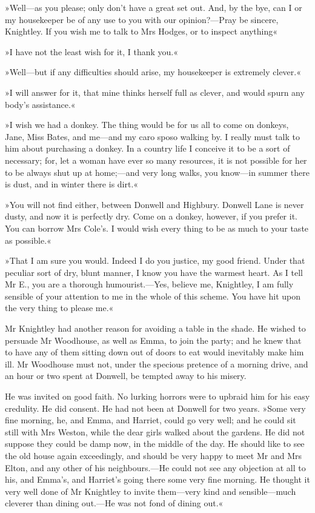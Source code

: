 »Well—as you please; only don't have a great set out. And, by the bye, can I or my housekeeper be of any use to you with our opinion?—Pray be sincere, Knightley. If you wish me to talk to Mrs Hodges, or to inspect anything\longdash«

»I have not the least wish for it, I thank you.«

»Well—but if any difficulties should arise, my housekeeper is extremely clever.«

»I will answer for it, that mine thinks herself full as clever, and would spurn any body's assistance.«

»I wish we had a donkey. The thing would be for us all to come on donkeys, Jane, Miss Bates, and me—and my caro sposo walking by. I really must talk to him about purchasing a donkey. In a country life I conceive it to be a sort of necessary; for, let a woman have ever so many resources, it is not possible for her to be always shut up at home;—and very long walks, you know—in summer there is dust, and in winter there is dirt.«

»You will not find either, between Donwell and Highbury. Donwell Lane is never dusty, and now it is perfectly dry. Come on a donkey, however, if you prefer it. You can borrow Mrs Cole's. I would wish every thing to be as much to your taste as possible.«

»That I am sure you would. Indeed I do you justice, my good friend. Under that peculiar sort of dry, blunt manner, I know you have the warmest heart. As I tell Mr E., you are a thorough humourist.—Yes, believe me, Knightley, I am fully sensible of your attention to me in the whole of this scheme. You have hit upon the very thing to please me.«

Mr Knightley had another reason for avoiding a table in the shade. He wished to persuade Mr Woodhouse, as well as Emma, to join the party; and he knew that to have any of them sitting down out of doors to eat would inevitably make him ill. Mr Woodhouse must not, under the specious pretence of a morning drive, and an hour or two spent at Donwell, be tempted away to his misery.

He was invited on good faith. No lurking horrors were to upbraid him for his easy credulity. He did consent. He had not been at Donwell for two years. »Some very fine morning, he, and Emma, and Harriet, could go very well; and he could sit still with Mrs Weston, while the dear girls walked about the gardens. He did not suppose they could be damp now, in the middle of the day. He should like to see the old house again exceedingly, and should be very happy to meet Mr and Mrs Elton, and any other of his neighbours.—He could not see any objection at all to his, and Emma's, and Harriet's going there some very fine morning. He thought it very well done of Mr Knightley to invite them—very kind and sensible—much cleverer than dining out.—He was not fond of dining out.«

